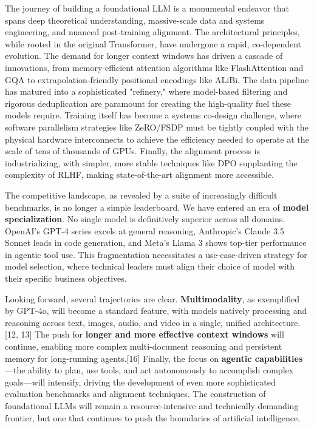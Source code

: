 \documentclass[12pt, a4paper]{article}
\begin{document}
The journey of building a foundational LLM is a monumental endeavor that spans deep theoretical understanding, massive-scale data and systems engineering, and nuanced post-training alignment. The architectural principles, while rooted in the original Transformer, have undergone a rapid, co-dependent evolution. The demand for longer context windows has driven a cascade of innovations, from memory-efficient attention algorithms like FlashAttention and GQA to extrapolation-friendly positional encodings like ALiBi. The data pipeline has matured into a sophisticated "refinery," where model-based filtering and rigorous deduplication are paramount for creating the high-quality fuel these models require. Training itself has become a systems co-design challenge, where software parallelism strategies like ZeRO/FSDP must be tightly coupled with the physical hardware interconnects to achieve the efficiency needed to operate at the scale of tens of thousands of GPUs. Finally, the alignment process is industrializing, with simpler, more stable techniques like DPO supplanting the complexity of RLHF, making state-of-the-art alignment more accessible.

The competitive landscape, as revealed by a suite of increasingly difficult benchmarks, is no longer a simple leaderboard. We have entered an era of \textbf{model specialization}. No single model is definitively superior across all domains. OpenAI's GPT-4 series excels at general reasoning, Anthropic's Claude 3.5 Sonnet leads in code generation, and Meta's Llama 3 shows top-tier performance in agentic tool use. This fragmentation necessitates a use-case-driven strategy for model selection, where technical leaders must align their choice of model with their specific business objectives.

Looking forward, several trajectories are clear. \textbf{Multimodality}, as exemplified by GPT-4o, will become a standard feature, with models natively processing and reasoning across text, images, audio, and video in a single, unified architecture.[12, 13] The push for \textbf{longer and more effective context windows} will continue, enabling more complex multi-document reasoning and persistent memory for long-running agents.[16] Finally, the focus on \textbf{agentic capabilities}—the ability to plan, use tools, and act autonomously to accomplish complex goals—will intensify, driving the development of even more sophisticated evaluation benchmarks and alignment techniques. The construction of foundational LLMs will remain a resource-intensive and technically demanding frontier, but one that continues to push the boundaries of artificial intelligence.
\end{document}
